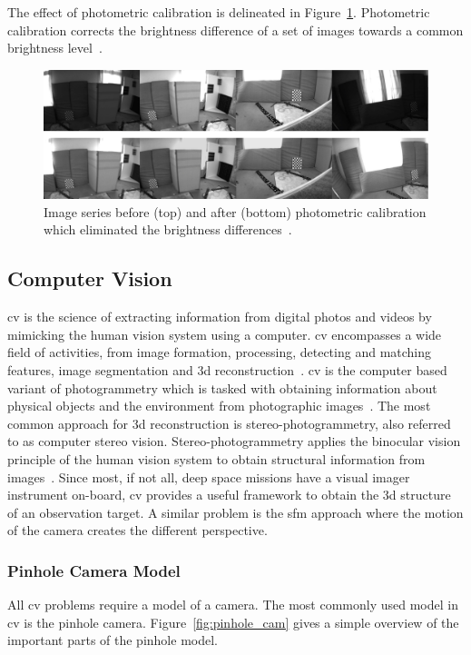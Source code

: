 The effect of photometric calibration is delineated in Figure~\ref{fig:t_photometry}. Photometric calibration corrects the brightness difference of a set of images towards a common brightness level~\cite{Bergmann2018OnlineSLAM}.
\begin{figure}[htb]
    \centering
    \includegraphics[width=\textwidth]{doc/thesis/0_figures/photo_calib.jpg}
    \caption{Image series before (top) and after (bottom) photometric calibration which eliminated the brightness differences~\cite{Bergmann2018OnlineSLAM}.}
    \label{fig:t_photometry}
\end{figure}

\subsection{Computer Vision} \label{sec:t_cv}
\Gls{cv} is the science of extracting information from digital photos and videos by mimicking the human vision system using a computer. \Gls{cv} encompasses a wide field of activities, from image formation, processing, detecting and matching features, image segmentation and \gls{3d} reconstruction~\cite{szeliski2010computer}. \Gls{cv} is the computer based variant of photogrammetry which is tasked with obtaining information about physical objects and the environment from photographic images~\cite{Kasser2002DigitalPhotogrammetry}. The most common approach for \gls{3d} reconstruction is stereo-photogrammetry, also referred to as computer stereo vision. Stereo-photogrammetry applies the binocular vision principle of the human vision system to obtain structural information from images~\cite{do2019review}. Since most, if not all, deep space missions have a visual imager instrument on-board, \gls{cv} provides a useful framework to obtain the \gls{3d} structure of an observation target. A similar problem is the \gls{sfm} approach where the motion of the camera creates the different perspective.

\subsubsection{Pinhole Camera Model}
All \gls{cv} problems require a model of a camera. The most commonly used model in \gls{cv} is the pinhole camera. Figure~\ref{fig:pinhole_cam} gives a simple overview of the important parts of the pinhole model.

